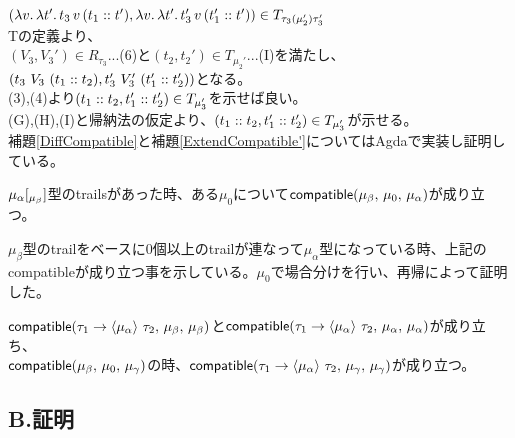 $(\Lam{v}{\Lam{t'}{t_3\,v\,(\Cons{t_1}{t'})}}, \Lam{v}{\Lam{t'}{t_3'\,v\,(\Cons{t_1'}{t'})}})\in T_{\tau_3(\mu_2')\tau_3'}$\\
Tの定義より、\\
$(V_3,V_3')\in R_{\tau_3}$...(6)と$(t_2,t_2')\in T_{\mu_2'}$...(I)を満たし、$(t_3\ V_3\ (\Cons{t_1}{t_2}),t_3'\ V_3'\ (\Cons{t_1'}{t_2'}))$となる。\\
(3),(4)より$(\Cons{t_1}{t_2},\Cons{t_1'}{t_2'})\in T_{\mu_3'}$を示せば良い。\\
(G),(H),(I)と帰納法の仮定より、$(\Cons{t_1}{t_2},\Cons{t_1'}{t_2'})\in T_{\mu_3'}$が示せる。
\\
補題\ref{DiffCompatible}と補題\ref{ExtendCompatible'}についてはAgdaで実装し証明している。
\setcounter{definition}{12}
\begin{lemma}
  $\Trails{\mu_{\alpha}}{\mu_{\beta}}$型のtrailsがあった時、ある$\mu_0$について$\Compatible{\mu_{\beta}}{\mu_0}{\mu_{\alpha}}$が成り立つ。
\label{DiffCompatible}
\end{lemma}
$\mu_{\beta}$型のtrailをベースに0個以上のtrailが連なって$\mu_{\alpha}$型になっている時、上記の\textsf{compatible}が成り立つ事を示している。$\mu_0$で場合分けを行い、再帰によって証明した。
\begin{lemma}
  $\Compatible{\Trail{\tau_1}{\tau_2}{\mu_{\alpha}}}{\mu_{\beta}}{\mu_{\beta}}$と$\Compatible{\Trail{\tau_1}{\tau_2}{\mu_{\alpha}}}{\mu_{\alpha}}{\mu_{\alpha}}$が成り立ち、\\$\Compatible{\mu_{\beta}}{\mu_0}{\mu_{\gamma}}$の時、$\Compatible{\Trail{\tau_1}{\tau_2}{\mu_{\alpha}}}{\mu_{\gamma}}{\mu_{\gamma}}$が成り立つ。
\label{ExtendCompatible'}
\end{lemma}

\subsection*{B.証明}

